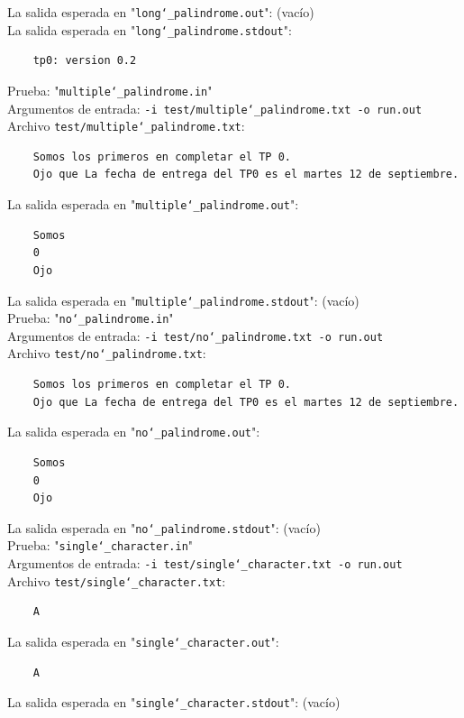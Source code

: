 \documentclass[a4paper,10pt]{article}
\begin{document}
    La salida esperada en "\texttt{long\char`_palindrome.out}": (vacío)\\
    La salida esperada en "\texttt{long\char`_palindrome.stdout}": \\
    \begin{Verbatim}
    tp0: version 0.2
    \end{Verbatim}
  
    Prueba: "\texttt{multiple\char`_palindrome.in}" \\
    Argumentos de entrada: \texttt{-i test/multiple\char`_palindrome.txt -o run.out}\\
    Archivo \texttt{test/multiple\char`_palindrome.txt}: \\
    \begin{Verbatim}
    Somos los primeros en completar el TP 0.
    Ojo que La fecha de entrega del TP0 es el martes 12 de septiembre.
    \end{Verbatim}
    La salida esperada en "\texttt{multiple\char`_palindrome.out}":\\
        \begin{Verbatim}
    Somos
    0
    Ojo
    \end{Verbatim}
    La salida esperada en "\texttt{multiple\char`_palindrome.stdout}": (vacío)\\
  
    Prueba: "\texttt{no\char`_palindrome.in}" \\
    Argumentos de entrada: \texttt{-i test/no\char`_palindrome.txt -o run.out}\\
    Archivo \texttt{test/no\char`_palindrome.txt}: \\
    \begin{Verbatim}
    Somos los primeros en completar el TP 0.
    Ojo que La fecha de entrega del TP0 es el martes 12 de septiembre.
    \end{Verbatim}
    La salida esperada en "\texttt{no\char`_palindrome.out}":\\
        \begin{Verbatim}
    Somos
    0
    Ojo
    \end{Verbatim}
    La salida esperada en "\texttt{no\char`_palindrome.stdout}": (vacío)\\
    
    
    Prueba: "\texttt{single\char`_character.in}" \\
    Argumentos de entrada: \texttt{-i test/single\char`_character.txt -o run.out}\\
    Archivo \texttt{test/single\char`_character.txt}: \\
    \begin{Verbatim}
    A
    \end{Verbatim}
    La salida esperada en "\texttt{single\char`_character.out}":\\
        \begin{Verbatim}
    A
    \end{Verbatim}
    La salida esperada en "\texttt{single\char`_character.stdout}": (vacío)\\
    
\end{document}

